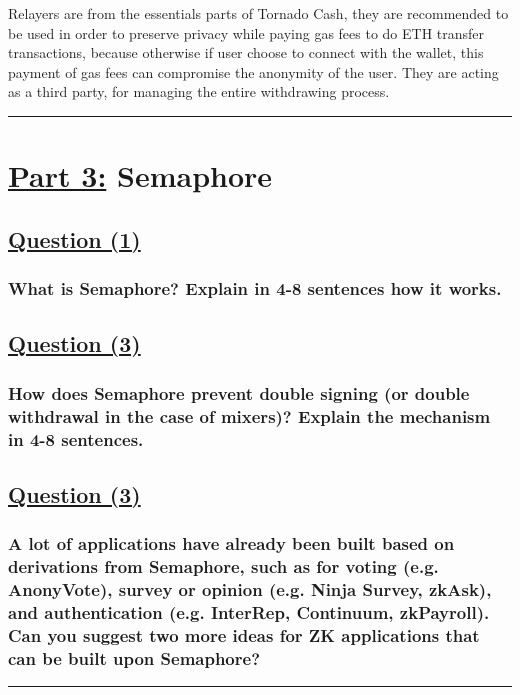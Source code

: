 \documentclass[letterpaper, 10 pt, conference]{ieeeconf}  %
\begin{document}
Relayers are from the essentials parts of Tornado Cash, they are recommended to be used in order to preserve privacy while paying gas fees to do ETH transfer transactions, because otherwise if user choose to connect with the wallet, this payment of gas fees can compromise the anonymity of the user. 
They are acting as a third party, for managing the entire withdrawing process. \cite{c1} 

\noindent\rule{8cm}{0.4pt}

\section{\textbf{\underline{Part 3:}} Semaphore}

\subsection{\textbf{}\underline{Question (1)}}
\subsubsection{\textbf{What is Semaphore? Explain in 4-8 sentences how it works.}}

\subsection{\textbf{\underline{Question (3)}}}
\subsubsection{\textbf{How does Semaphore prevent double signing (or double withdrawal in the case of mixers)? Explain the mechanism in 4-8 sentences.}}

\subsection{\textbf{\underline{Question (3)}}}
\subsubsection{\textbf{A lot of applications have already been built based on derivations from Semaphore, such as for voting (e.g. AnonyVote), survey or opinion (e.g. Ninja Survey, zkAsk), and authentication (e.g. InterRep, Continuum, zkPayroll). Can you suggest two more ideas for ZK applications that can be built upon Semaphore?}}

\noindent\rule{8cm}{0.4pt}
\newpage
\end{document}
